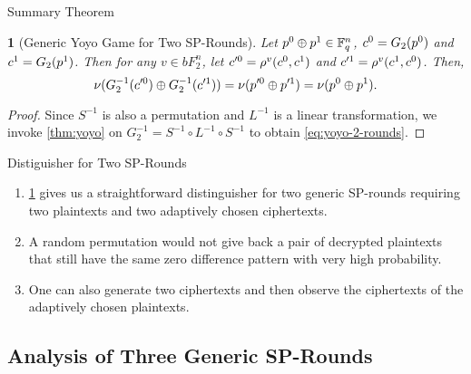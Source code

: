 \documentclass[notheorems]{beamer}
\newtheorem{theorem}{\translate{Theorem}}[section]
\newtheorem{theorem}{\translate{Theorem}}
\theoremstyle{definition}
\theoremstyle{example}
\begin{document}
    \begin{frame}{Summary Theorem}
        \begin{theorem}[Generic Yoyo Game for Two SP-Rounds]
            \label{thm:yoyo-2-rounds}
            Let \(p^0 \oplus p^1 \in \mathbb F_q^n\), \(c^0 = G_2(p^0)\) and
            \(c^1 = G_2(p^1)\). Then for any \(v \in bF_2^n\), let
            \(c^{\prime 0} = \rho^v(c^0, c^1)\) and \(c^{\prime 1} =
            \rho^v(c^1, c^0)\). Then,
            \begin{equation}
                \nu(G_2^{-1}(c^{\prime 0}) \oplus G_2^{-1}(c^{\prime 1})) = \nu(p^{\prime 0} \oplus p^{\prime 1}) = \nu(p^0 \oplus p^1).
                \label{eq:yoyo-2-rounds}
            \end{equation}
        \end{theorem}
        \pause
        \begin{proof}
            Since \(S^{-1}\) is also a permutation and \(L^{-1}\) is a linear
            transformation, we invoke \cref{thm:yoyo} on \(G_2^{-1} = S^{-1}
            \circ L^{-1} \circ S^{-1}\) to obtain \eqref{eq:yoyo-2-rounds}.
        \end{proof}
    \end{frame}

    \begin{frame}{Distiguisher for Two SP-Rounds}
        \begin{enumerate}
            \item<1-> \cref{thm:yoyo-2-rounds} gives us a straightforward
            distinguisher for two generic SP-rounds requiring two plaintexts and
            two adaptively chosen ciphertexts. 
            \item<2-> A random permutation would not give back a pair of
            decrypted plaintexts that still have the same zero difference
            pattern with very high probability. 
            \item<3-> One can also generate two ciphertexts and then observe the
            ciphertexts of the adaptively chosen plaintexts.
        \end{enumerate}
    \end{frame}

    \subsection{Analysis of Three Generic SP-Rounds}
    \label{subsec:yoyo-3-rounds}
\end{document}
